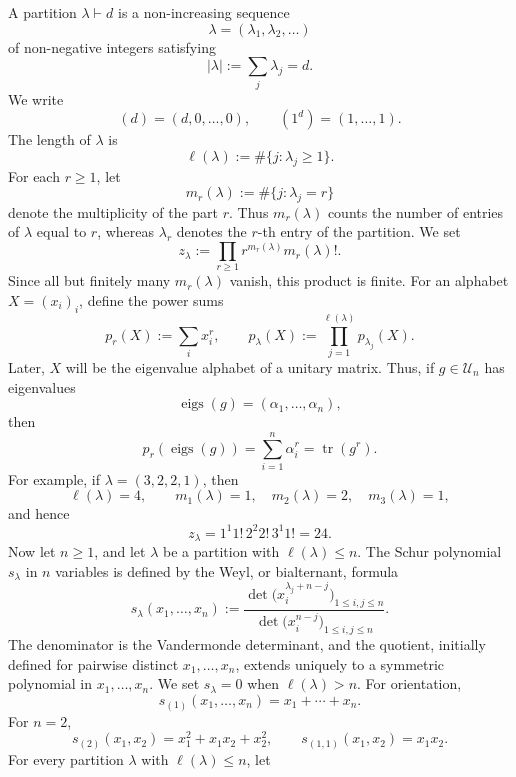 \documentclass[11pt,showkeys]{amsart}
\begin{document}
A partition \(\lambda\vdash d\) is a
non-increasing sequence
\[
        \lambda=(\lambda_1,\lambda_2,\ldots)
\]
of non-negative integers satisfying
\[
        |\lambda|
        :=
        \sum_j\lambda_j
        =
        d.
\]
We write
\[
        (d)=(d,0,\ldots,0),
        \qquad
        (1^d)=(1,\ldots,1).
\]
The length of \(\lambda\) is
\[
        \ell(\lambda)
        :=
        \#\{j:\lambda_j\ge 1\}.
\]
For each \(r\ge 1\), let
\[
        m_r(\lambda)
        :=
        \#\{j:\lambda_j=r\}
\]
denote the multiplicity of the part \(r\). Thus \(m_r(\lambda)\) counts
the number of entries of \(\lambda\) equal to \(r\), whereas
\(\lambda_r\) denotes the \(r\)-th entry of the partition. We set
\[
        z_\lambda
        :=
        \prod_{r\ge 1}
        r^{m_r(\lambda)}m_r(\lambda)!.
\]
Since all but finitely many \(m_r(\lambda)\) vanish, this product is
finite.
For an alphabet \(X=(x_i)_i\), define the power sums
\[
        p_r(X)
        :=
        \sum_i x_i^r,
        \qquad
        p_\lambda(X)
        :=
        \prod_{j=1}^{\ell(\lambda)}
        p_{\lambda_j}(X).
\]
Later, \(X\) will be the eigenvalue alphabet of a unitary matrix. Thus, if
\(g\in\mathcal U_n\) has eigenvalues
\[
        \operatorname{eigs}(g)
        =
        (\alpha_1,\ldots,\alpha_n),
\]
then
\[
        p_r(\operatorname{eigs}(g))
        =
        \sum_{i=1}^n\alpha_i^r
        =
        \operatorname{tr}(g^r).
\]
For example, if \(\lambda=(3,2,2,1)\), then
\[
        \ell(\lambda)=4,
        \qquad
        m_1(\lambda)=1,
        \quad
        m_2(\lambda)=2,
        \quad
        m_3(\lambda)=1,
\]
and hence
\[
        z_\lambda
        =
        1^1 1!\,2^2 2!\,3^1 1!
        =
        24.
\]
Now let \(n\ge 1\), and let \(\lambda\) be a partition with
\(\ell(\lambda)\le n\). The Schur polynomial \(s_\lambda\) in \(n\)
variables is defined by the Weyl, or bialternant, formula
\[
        s_\lambda(x_1,\ldots,x_n)
        :=
        \frac{
        \det\bigl(x_i^{\lambda_j+n-j}\bigr)_{1\le i,j\le n}}
        {\det\bigl(x_i^{n-j}\bigr)_{1\le i,j\le n}}.
\]
The denominator is the Vandermonde determinant, and the quotient,
initially defined for pairwise distinct \(x_1,\ldots,x_n\), extends
uniquely to a symmetric polynomial in \(x_1,\ldots,x_n\). We set
\(s_\lambda=0\) when \(\ell(\lambda)>n\). For orientation,
\[
        s_{(1)}(x_1,\ldots,x_n)
        =
        x_1+\cdots+x_n.
\]
For \(n=2\),
\[
        s_{(2)}(x_1,x_2)
        =
        x_1^2+x_1x_2+x_2^2,
        \qquad
        s_{(1,1)}(x_1,x_2)
        =
        x_1x_2.
\]
For every partition \(\lambda\) with \(\ell(\lambda)\leq n\), let
\end{document}
